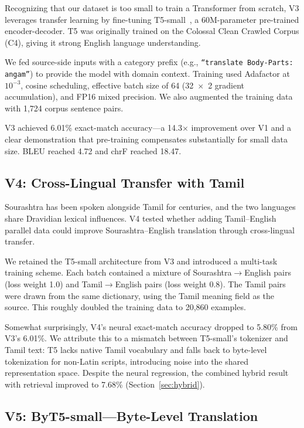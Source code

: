 \documentclass[conference]{IEEEtran}
\begin{document}
Recognizing that our dataset is too small to train a Transformer from scratch, V3 leverages transfer learning by fine-tuning T5-small~\cite{raffel2020t5}, a 60M-parameter pre-trained encoder-decoder. T5 was originally trained on the Colossal Clean Crawled Corpus (C4), giving it strong English language understanding.

We fed source-side inputs with a category prefix (e.g., \texttt{``translate Body-Parts: angam''}) to provide the model with domain context. Training used Adafactor at $10^{-3}$, cosine scheduling, effective batch size of 64 (32~$\times$~2 gradient accumulation), and FP16 mixed precision. We also augmented the training data with 1,724 corpus sentence pairs.

V3 achieved 6.01\% exact-match accuracy---a 14.3$\times$ improvement over V1 and a clear demonstration that pre-training compensates substantially for small data size. BLEU reached 4.72 and chrF reached 18.47.

\subsection{V4: Cross-Lingual Transfer with Tamil}

Sourashtra has been spoken alongside Tamil for centuries, and the two languages share Dravidian lexical influences. V4 tested whether adding Tamil--English parallel data could improve Sourashtra--English translation through cross-lingual transfer.

We retained the T5-small architecture from V3 and introduced a multi-task training scheme. Each batch contained a mixture of Sourashtra$\rightarrow$English pairs (loss weight 1.0) and Tamil$\rightarrow$English pairs (loss weight 0.8). The Tamil pairs were drawn from the same dictionary, using the Tamil meaning field as the source. This roughly doubled the training data to 20,860 examples.

Somewhat surprisingly, V4's neural exact-match accuracy dropped to 5.80\% from V3's 6.01\%. We attribute this to a mismatch between T5-small's tokenizer and Tamil text: T5 lacks native Tamil vocabulary and falls back to byte-level tokenization for non-Latin scripts, introducing noise into the shared representation space. Despite the neural regression, the combined hybrid result with retrieval improved to 7.68\% (Section~\ref{sec:hybrid}).

\subsection{V5: ByT5-small---Byte-Level Translation}
\end{document}
